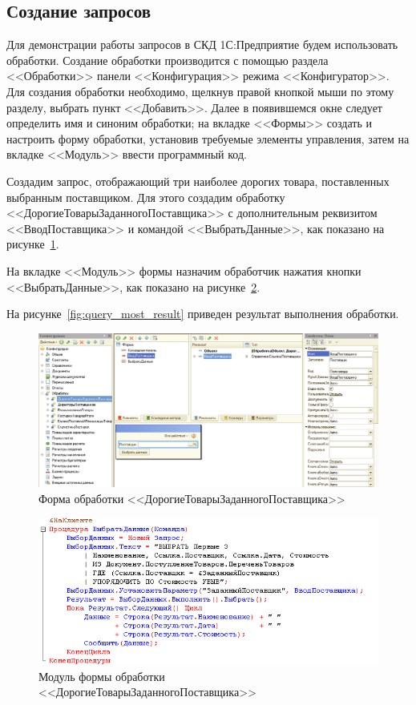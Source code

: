 \pagebreak

\subsection{Создание запросов}

Для демонстрации работы запросов в СКД 1С:Предприятие будем
использовать обработки.
Создание обработки производится с помощью раздела
<<Обработки>> панели <<Конфигурация>> режима <<Конфигуратор>>.
Для создания обработки необходимо,
щелкнув правой кнопкой мыши по этому
разделу, выбрать пункт <<Добавить>>. Далее в появившемся окне
следует определить имя и синоним обработки;
на вкладке <<Формы>> создать и настроить форму обработки,
установив требуемые элементы управления, затем на вкладке
<<Модуль>> ввести программный код.


Создадим запрос, отображающий три наиболее дорогих товара,
поставленных выбранным поставщиком.
Для этого создадим обработку <<ДорогиеТоварыЗаданногоПоставщика>>
с дополнительным реквизитом <<ВводПоставщика>> и командой
<<ВыбратьДанные>>, как показано на рисунке~\ref{fig:query_most_form}.

На вкладке <<Модуль>> формы назначим обработчик нажатия кнопки
<<ВыбратьДанные>>, как показано на рисунке~\ref{fig:query_most_module}.

На рисунке~\ref{fig:query_most_result} приведен результат
выполнения обработки.

\begin{figure}[h!]
  \centering
  \includegraphics[width=150mm]{pic/query_most_form}
  \caption{Форма обработки <<ДорогиеТоварыЗаданногоПоставщика>>}
  \label{fig:query_most_form}
\end{figure}

\begin{figure}[h!]
  \centering
  \includegraphics[width=130mm]{pic/query_most_module}
  \caption{Модуль формы обработки \\ <<ДорогиеТоварыЗаданногоПоставщика>>}
  \label{fig:query_most_module}
\end{figure}

